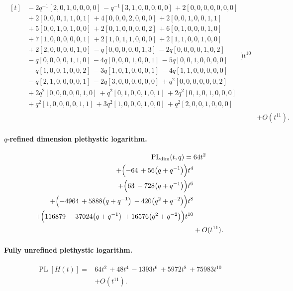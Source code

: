 \documentclass[10pt]{article}
\begin{document}
\[\begin{aligned}
\begin{aligned}[t]
  &{}-2q^{-1}[2,0,1,0,0,0,0]\,-q^{-1}[3,1,0,0,0,0,0]\,+2[0,0,0,0,0,0,0] \\
  &{}+2[0,0,0,1,1,0,1]\,+4[0,0,0,2,0,0,0]\,+2[0,0,1,0,0,1,1] \\
  &{}+5[0,0,1,0,1,0,0]\,+2[0,1,0,0,0,0,2]\,+6[0,1,0,0,0,1,0] \\
  &{}+7[1,0,0,0,0,0,1]\,+2[1,0,1,1,0,0,0]\,+2[1,1,0,0,1,0,0] \\
  &{}+2[2,0,0,0,0,1,0]\,-q[0,0,0,0,0,1,3]\,-2q[0,0,0,0,1,0,2] \\
  &{}-q[0,0,0,0,1,1,0]\,-4q[0,0,0,1,0,0,1]\,-5q[0,0,1,0,0,0,0] \\
  &{}-q[1,0,0,1,0,0,2]\,-3q[1,0,1,0,0,0,1]\,-4q[1,1,0,0,0,0,0] \\
  &{}-q[2,1,0,0,0,0,1]\,-2q[3,0,0,0,0,0,0]\,+q^{2}[0,0,0,0,0,0,2] \\
  &{}+2q^{2}[0,0,0,0,0,1,0]\,+q^{2}[0,1,0,0,1,0,1]\,+2q^{2}[0,1,0,1,0,0,0] \\
  &{}+q^{2}[1,0,0,0,0,1,1]\,+3q^{2}[1,0,0,0,1,0,0]\,+q^{2}[2,0,0,1,0,0,0]\end{aligned}\Bigr)t^{10} \\
  &+ O(t^{11}).
\end{aligned}
\]
\paragraph{$q$-refined dimension plethystic logarithm.}
\[
\begin{aligned}
\operatorname{PL}_{\mathrm{dim}}(t,q) ={}&
   64t^{2} \\
  + \Bigl(-64\,+56\bigl(q+q^{-1}\bigr)\Bigr)t^{4} \\
  + \Bigl(63\,-728\bigl(q+q^{-1}\bigr)\Bigr)t^{6} \\
  + \Bigl(-4964\,+5888\bigl(q+q^{-1}\bigr)\,-420\bigl(q^{2}+q^{-2}\bigr)\Bigr)t^{8} \\
  + \Bigl(116879\,-37024\bigl(q+q^{-1}\bigr)\,+16576\bigl(q^{2}+q^{-2}\bigr)\Bigr)t^{10} \\
  &+ O(t^{11}).
\end{aligned}
\]
\paragraph{Fully unrefined plethystic logarithm.}
\[
\begin{aligned}
\operatorname{PL}[H(t)] ={}& 64t^{2}\,+48t^{4}\,-1393t^{6}\,+5972t^{8}\,+75983t^{10} \\
  &+ O(t^{11}).
\end{aligned}
\]
\end{document}
